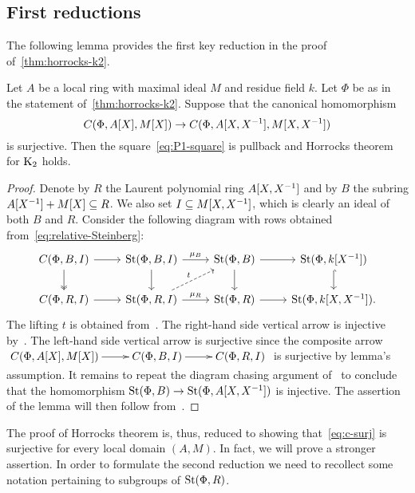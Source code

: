 \subsection{First reductions} \label{subsec:structure-theorem-overview}

The following lemma provides the first key reduction in the proof of~\cref{thm:horrocks-k2}.
\begin{lemma} \label{lem:first-reduction}
Let $A$ be a local ring with maximal ideal $M$ and residue field $k$.
Let $\Phi$ be as in the statement of~\cref{thm:horrocks-k2}.
Suppose that the canonical homomorphism
\begin{equation} \label{eq:c-surj} C(\Phi, A[X], M[X]) \to C(\Phi, A[X, X^{-1}], M[X, X^{-1}]) \end{equation}
is surjective.
Then the square~\eqref{eq:P1-square} is pullback and Horrocks theorem for $\operatorname{K}_2$ holds.
\end{lemma}
\begin{proof}
    Denote by $R$ the Laurent polynomial ring $A[X, X^{-1}]$ and by $B$ the subring $A[X^{-1}] + M[X] \subseteq R$.
    We also set $I \subseteq M[X, X^{-1}]$, which is clearly an ideal of both $B$ and $R$.
    Consider the following diagram with rows obtained from~\eqref{eq:relative-Steinberg}:
    \[\begin{tikzcd}
          C(\Phi, B, I) \arrow{r} \arrow[d, swap, twoheadrightarrow] & \St(\Phi, B, I) \arrow{r}{\mu_B} \arrow{d} & \St(\Phi, B) \arrow{r} \arrow{d} & \St(\Phi, k[X^{-1}]) \arrow[hookrightarrow]{d} \\
          C(\Phi, R, I) \arrow{r} & \St(\Phi, R, I) \arrow{r}{\mu_R} \arrow[ur, "t", dashrightarrow] & \St(\Phi, R) \arrow{r} & \St(\Phi, k[X, X^{-1}]).
    \end{tikzcd}\]
    The lifting $t$ is obtained from~\cite[Lemma~3.3]{LS20}.
    The right-hand side vertical arrow is injective by~\cite[Lemma~2.2]{LS20}.
    The left-hand side vertical arrow is surjective since the composite arrow
    $\xymatrix{ C(\Phi, A[X], M[X]) \ar[r] & C(\Phi, B, I) \ar[r] & C(\Phi, R, I) }$
    is surjective by lemma's assumption.
    It remains to repeat the diagram chasing argument of~\cite[Theorem~1]{LS20} to conclude that the homomorphism $\operatorname{St}(\Phi, B) \to \operatorname{St}(\Phi, A[X, X^{-1}])$ is injective.
    The assertion of the lemma will then follow from~\cite[Theorem~3]{LS20}.
\end{proof}
The proof of Horrocks theorem is, thus, reduced to showing that~\eqref{eq:c-surj} is surjective for every local domain $(A, M)$.
In fact, we will prove a stronger assertion.
In order to formulate the second reduction we need to recollect some notation pertaining to subgroups of $\operatorname{St}(\Phi, R)$.

